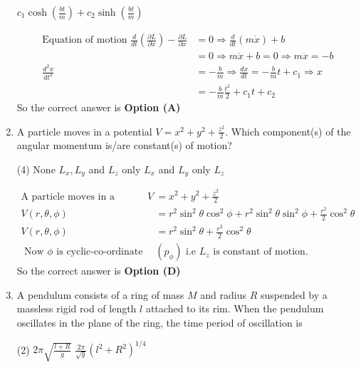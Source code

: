 \begin{enumerate}
\begin{tasks}
\task[\textbf{D.}] $c_{1} \cosh \left(\frac{b t}{m}\right)+c_{2} \sinh \left(\frac{b t}{m}\right)$
\end{tasks}
\begin{answer}
\begin{align*}
\text{Equation of motion }\frac{d}{d t}\left(\frac{\partial L}{\partial \dot{x}}\right)-\frac{\partial L}{\partial x}&=0 \Rightarrow \frac{d}{d t}(m \dot{x})+b\\&=0 \Rightarrow m \ddot{x}+b=0 \Rightarrow m \ddot{x}=-b\\
\frac{d^{2} x}{d t^{2}}&=-\frac{b}{m} \Rightarrow \frac{d x}{d t}=-\frac{b}{m} t+c_{1} \Rightarrow x\\&=-\frac{b}{m} \frac{t^{2}}{2}+c_{1} t+c_{2}
\end{align*}
So the correct answer is \textbf{Option (A)}
\end{answer}	
\item A particle moves in a potential $V=x^{2}+y^{2}+\frac{z^{2}}{2} .$ Which component(s) of the angular momentum is/are constant(s) of motion?
{}
\begin{tasks}(4)
\task[\textbf{A.}] None
\task[\textbf{B.}] $L_{x}, L_{y}$ and $L_{z}$
\task[\textbf{C.}]  only $L_{x}$ and $L_{y}$
\task[\textbf{D.}] only $L_{z}$
\end{tasks}
\begin{answer}
\begin{align*}
\text{A particle moves in a potential }V&=x^{2}+y^{2}+\frac{z^{2}}{2}\\
V(r, \theta, \phi)&=r^{2} \sin ^{2} \theta \cos ^{2} \phi+r^{2} \sin ^{2} \theta \sin ^{2} \phi+\frac{r^{2}}{2} \cos ^{2} \theta\\
V(r, \theta, \phi)&=r^{2} \sin ^{2} \theta+\frac{r^{2}}{2} \cos ^{2} \theta\\
\text{	Now $\phi$ is cyclic-co-ordinate }&\left(p_{\phi}\right)\text{ i.e $L_{z}$ is constant of motion.}
\end{align*}
So the correct answer is \textbf{Option (D)}
\end{answer}
\item A pendulum consists of a ring of mass $M$ and radius $R$ suspended by a massless rigid rod of length $l$ attached to its rim. When the pendulum oscillates in the plane of the ring, the time period of oscillation is
{}
\begin{tasks}(2)
\task[\textbf{A.}] $2 \pi \sqrt{\frac{l+R}{g}}$
\task[\textbf{B.}] $\frac{2 \pi}{\sqrt{g}}\left(l^{2}+R^{2}\right)^{1 / 4}$

\end{tasks}
\end{enumerate}
